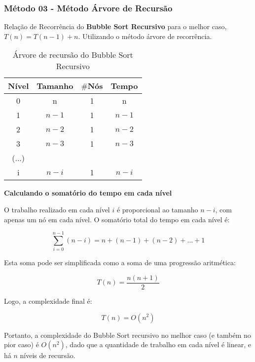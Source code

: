 \subsubsection{Método 03 - Método Árvore de Recursão}

Relação de Recorrência do \textbf{Bubble Sort Recursivo} para o melhor caso, \( T(n) = T(n - 1) + n \). Utilizando o método árvore de recorrência.

\begin{table}[ht!]
    \centering
    \begin{tabular}{|c|c|c|c|}
    \hline
    \textbf{Nível} & \textbf{Tamanho} & $\#$\textbf{Nós} & \textbf{Tempo} \\ \hline
     0 & n & 1 & n \\ \hline
     1 & $n - 1$ & 1 & $n - 1$ \\ \hline
     2 & $n - 2$ & 1 & $n - 2$ \\ \hline
     3 & $n - 3$ & 1 & $n - 3$ \\ \hline
     (...) & & & \\ \hline
     i & $n - i$ & 1 & $n - i$ \\ \hline 
    \end{tabular}  
    \caption{Árvore de recursão do Bubble Sort Recursivo}
\end{table}

\textbf{Calculando o somatório do tempo em cada nível}

O trabalho realizado em cada nível \(i\) é proporcional ao tamanho \( n - i \), com apenas um nó em cada nível. O somatório total do tempo em cada nível é:

\[
\sum_{i=0}^{n-1} (n - i) = n + (n-1) + (n-2) + \dots + 1
\]

Esta soma pode ser simplificada como a soma de uma progressão aritmética:

\[
T(n) = \frac{n(n+1)}{2}
\]

Logo, a complexidade final é:

\[
T(n) = O(n^2)
\]

Portanto, a complexidade do Bubble Sort recursivo no melhor caso (e também no pior caso) é \( O(n^2) \), dado que a quantidade de trabalho em cada nível é linear, e há \( n \) níveis de recursão.
